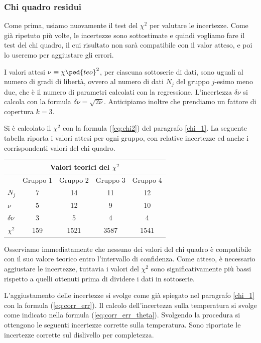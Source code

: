 \subsubsection{Chi quadro residui}

Come prima, usiamo nuovamente il test del $\chi^2$ per valutare le incertezze. Come già ripetuto più volte,
le incertezze sono sottostimate e quindi vogliamo fare il test del chi quadro, il cui risultato non sarà compatibile con il valor atteso,
e poi lo useremo per aggiustare gli errori.

I valori attesi $\nu \equiv \chi\ped{teo}^2$, per ciascuna sottoserie di dati, sono uguali al numero di gradi di libertà,
ovvero al numero di dati $N_j$ del gruppo $j$-esimo meno due, che è il numero di parametri calcolati con la regressione.
L'incertezza $\delta \nu$ si calcola con la formula $\delta \nu = \sqrt{2\nu}$. Anticipiamo inoltre che prendiamo un fattore di copertura
$k = 3$.

Si è calcolato il $\chi^2$ con la formula (\ref{eq:chi2}) del paragrafo \ref{chi_1}.
La seguente tabella riporta i valori attesi per ogni gruppo, con relative incertezze ed anche i corrispondenti valori del chi quadro.

\begin{center}
    \begin{tabular}{l c c c c}
        \multicolumn{5}{c}{\textbf{Valori teorici del $\chi^2$}} \\
        \toprule
        & Gruppo 1 & Gruppo 2 & Gruppo 3 & Gruppo 4 \\
        \midrule
        $N_j$ & 7 & 14 & 11 & 12 \\
        $\nu$ & 5 & 12 & 9 & 10 \\
        $\delta \nu$ & 3 & 5 & 4 & 4 \\
        $\chi^2$ & 159 & 1521 & 3587 & 1541 \\
        \bottomrule
    \end{tabular}
\end{center}

Osserviamo immediatamente che nessuno dei valori del chi quadro è compatibile con il suo valore teorico entro l'intervallo di confidenza.
Come atteso, è necessario aggiustare le incertezze, tuttavia i valori del $\chi^2$ sono significativamente più bassi rispetto a
quelli ottenuti prima di dividere i dati in sottoserie.

L'aggiustamento delle incertezze si svolge come già spiegato nel paragrafo \ref{chi_1} con la formula (\ref{eq:corr_err}).
Il calcolo dell'incertezza sulla temperatura si svolge come indicato nella formula (\ref{eq:corr_err_theta}).
Svolgendo la procedura si ottengono le seguenti incertezze corrette sulla temperatura. Sono riportate le incertezze corrette
sul dislivello per completezza.

